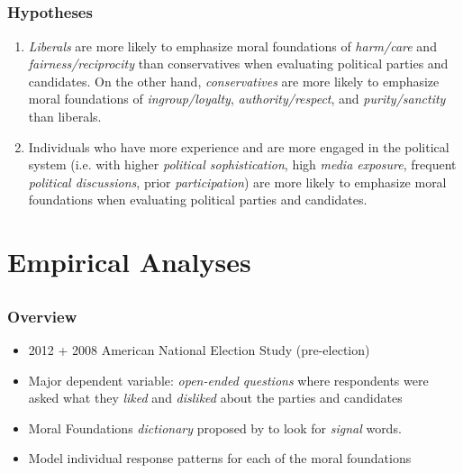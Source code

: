 \documentclass{beamer}
\begin{document}
\subsection{}
\begin{frame}%
  \frametitle{Hypotheses}
  \begin{enumerate}
    \item \emph{Liberals} are more likely to emphasize moral foundations of \emph{harm/care} and \emph{fairness/reciprocity} than conservatives when evaluating political parties and candidates. On the other hand, \emph{conservatives} are more likely to emphasize moral foundations of \emph{ingroup/loyalty}, \emph{authority/respect}, and \emph{purity/sanctity} than liberals.
    \item Individuals who have more experience and are more engaged in the political system (i.e. with higher \emph{political sophistication}, high \emph{media exposure}, frequent \emph{political discussions}, prior \emph{participation}) are more likely to emphasize moral foundations when evaluating political parties and candidates.
  \end{enumerate}
\end{frame}

\section{Empirical Analyses}
\subsection{}
\begin{frame}%
  \frametitle{Overview}
  \begin{itemize}
    \item 2012 + 2008 American National Election Study (pre-election)
    \item Major dependent variable: \emph{open-ended questions} where respondents were asked what they \emph{liked} and \emph{disliked} about the parties and candidates
    \item Moral Foundations \emph{dictionary} proposed by \citep{graham2009liberals} to look for \emph{signal} words.
    \item Model individual response patterns for each of the moral foundations
  \end{itemize}
\end{frame}
\end{document}
